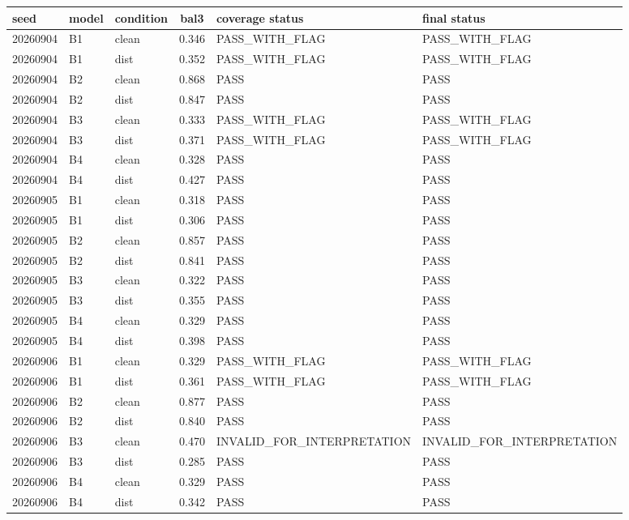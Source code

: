 \begingroup\setlength{\tabcolsep}{3pt}\small\begin{tabular}{@{}lllcp{3.15cm}p{3.15cm}@{}}
\toprule
seed & model & condition & bal3 & coverage status & final status \\
\midrule
20260904 & B1 & clean & 0.346 & PASS\_\allowbreak{}WITH\_\allowbreak{}FLAG & PASS\_\allowbreak{}WITH\_\allowbreak{}FLAG \\
20260904 & B1 & dist & 0.352 & PASS\_\allowbreak{}WITH\_\allowbreak{}FLAG & PASS\_\allowbreak{}WITH\_\allowbreak{}FLAG \\
20260904 & B2 & clean & 0.868 & PASS & PASS \\
20260904 & B2 & dist & 0.847 & PASS & PASS \\
20260904 & B3 & clean & 0.333 & PASS\_\allowbreak{}WITH\_\allowbreak{}FLAG & PASS\_\allowbreak{}WITH\_\allowbreak{}FLAG \\
20260904 & B3 & dist & 0.371 & PASS\_\allowbreak{}WITH\_\allowbreak{}FLAG & PASS\_\allowbreak{}WITH\_\allowbreak{}FLAG \\
20260904 & B4 & clean & 0.328 & PASS & PASS \\
20260904 & B4 & dist & 0.427 & PASS & PASS \\
20260905 & B1 & clean & 0.318 & PASS & PASS \\
20260905 & B1 & dist & 0.306 & PASS & PASS \\
20260905 & B2 & clean & 0.857 & PASS & PASS \\
20260905 & B2 & dist & 0.841 & PASS & PASS \\
20260905 & B3 & clean & 0.322 & PASS & PASS \\
20260905 & B3 & dist & 0.355 & PASS & PASS \\
20260905 & B4 & clean & 0.329 & PASS & PASS \\
20260905 & B4 & dist & 0.398 & PASS & PASS \\
20260906 & B1 & clean & 0.329 & PASS\_\allowbreak{}WITH\_\allowbreak{}FLAG & PASS\_\allowbreak{}WITH\_\allowbreak{}FLAG \\
20260906 & B1 & dist & 0.361 & PASS\_\allowbreak{}WITH\_\allowbreak{}FLAG & PASS\_\allowbreak{}WITH\_\allowbreak{}FLAG \\
20260906 & B2 & clean & 0.877 & PASS & PASS \\
20260906 & B2 & dist & 0.840 & PASS & PASS \\
20260906 & B3 & clean & 0.470 & INVALID\_\allowbreak{}FOR\_\allowbreak{}INTER\allowbreak{}PRETATION & INVALID\_\allowbreak{}FOR\_\allowbreak{}INTER\allowbreak{}PRETATION \\
20260906 & B3 & dist & 0.285 & PASS & PASS \\
20260906 & B4 & clean & 0.329 & PASS & PASS \\
20260906 & B4 & dist & 0.342 & PASS & PASS \\
\bottomrule
\end{tabular}\endgroup
